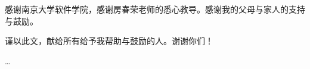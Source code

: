 \documentclass[
    fontset = mac %
  ]{njuthesis}
\begin{document}
\tableofcontents

\mainmatter


%   
%   









\printbibliography


\begin{acknowledgement}
感谢南京大学软件学院，感谢房春荣老师的悉心教导。感谢我的父母与家人的支持与鼓励。

谨以此文，献给所有给予我帮助与鼓励的人。谢谢你们！
\end{acknowledgement}




\appendix

\dots

\end{document}
